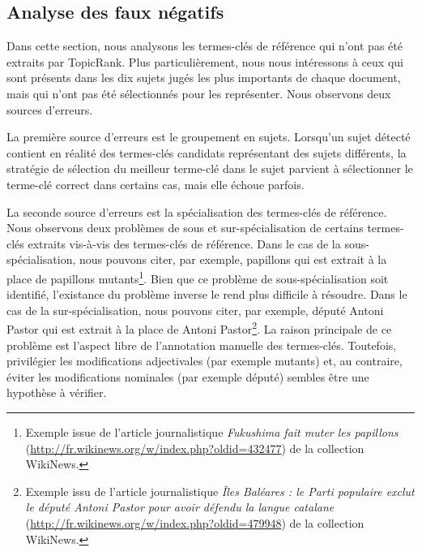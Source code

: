   \subsection{Analyse des faux négatifs}
  \label{subsec:analyse_faux_négatifs}
    Dans cette section, nous analysons les termes-clés de référence qui n'ont
    pas été extraits par TopicRank. Plus particulièrement, nous nous intéressons
    à ceux qui sont présents dans les dix sujets jugés les plus importants de
    chaque document, mais qui n'ont pas été sélectionnés pour les représenter.
    Nous observons deux sources d'erreurs.

    La première source d'erreurs est le groupement en sujets. Lorsqu'un sujet
    détecté contient en réalité des termes-clés candidats représentant des
    sujets différents, la stratégie de sélection du meilleur terme-clé dans le
    sujet parvient à sélectionner le terme-clé correct dans certains cas, mais
    elle échoue parfois.

    La seconde source d'erreurs est la spécialisation des termes-clés de
    référence. Nous observons deux problèmes de sous et sur-spécialisation de
    certains termes-clés extraits vis-à-vis des termes-clés de référence. Dans
    le cas de la sous-spécialisation, nous pouvons citer, par exemple,
    \og{}papillons\fg{} qui est extrait à la place de \og{}papillons
    mutants\fg{}\footnote{Exemple issue de l'article journalistique
    \textit{Fukushima fait muter les papillons}
    (\url{http://fr.wikinews.org/w/index.php?oldid=432477}) de la collection
    WikiNews.}. Bien que ce problème de sous-spécialisation soit identifié,
    l'existance du problème inverse le rend plus difficile à résoudre. Dans le
    cas de la sur-spécialisation, nous pouvons citer, par exemple, \og{}député
    Antoni Pastor\fg{} qui est extrait à la place de \og{}Antoni
    Pastor\fg{}\footnote{Exemple issu de l'article journalistique \textit{Îles
    Baléares : le Parti populaire exclut le député Antoni Pastor pour avoir
    défendu la langue catalane}
    (\url{http://fr.wikinews.org/w/index.php?oldid=479948}) de la collection
    WikiNews.}. La raison principale de ce problème est l'aspect libre de
    l'annotation manuelle des termes-clés. Toutefois, privilégier les
    modifications adjectivales (par exemple \og{}mutants\fg{}) et, au contraire,
    éviter les modifications nominales (par exemple \og{}député\fg{}) sembles être une
    hypothèse à vérifier.

